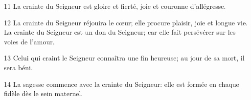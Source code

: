 
11 La crainte du Seigneur est gloire et fierté, joie et couronne d’allégresse.

12 La crainte du Seigneur réjouira le cœur; elle procure plaisir, joie et longue vie. La crainte du Seigneur est un don du Seigneur; car elle fait persévérer sur les voies de l’amour.

13 Celui qui craint le Seigneur connaîtra une fin heureuse; au jour de sa mort, il sera béni.

14 La sagesse commence avec la crainte du Seigneur: elle est formée en chaque fidèle dès le sein maternel.